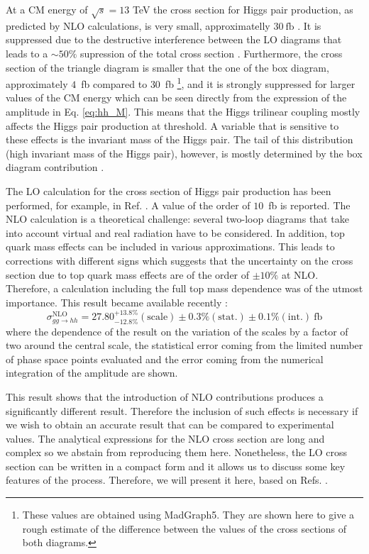 At a CM energy of $\sqrt{s}=13$ TeV the cross section for Higgs pair production, as predicted by NLO calculations, is very small, approximatelly $30~\text{fb}$ \cite{hhxsNLO}. It is suppressed due to the destructive interference between the LO diagrams that leads to a $\sim 50\%$ supression of the total cross section \cite{FCCyellow}. Furthermore, the cross section of the triangle diagram is smaller that the one of the box diagram, approximately $4$~fb compared to $30$~fb \footnote{These values are obtained using MadGraph5. They are shown here to give a rough estimate of the difference between the values of the cross sections  of both diagrams.}, and it is strongly suppressed for larger values of the CM energy which can be seen directly from the expression of the amplitude in Eq. \ref{eq:hh_M}. This means that the Higgs trilinear coupling mostly affects the Higgs pair production at threshold. A variable that is sensitive to these effects is the invariant mass of the Higgs pair. The tail of this distribution (high invariant mass of the Higgs pair), however, is mostly determined by the box diagram contribution \cite{FCCyellow}.  

The LO calculation for the cross section of Higgs pair production has been performed, for example, in Ref. \cite{HHxs_LO}. A value of the order of $10$~fb is reported. The NLO calculation is a theoretical challenge: several two-loop diagrams that take into account virtual and real radiation have to be considered. In addition, top quark mass effects can be included in various approximations. This leads to corrections with different signs which suggests that the uncertainty on the cross section due to top quark mass effects are of the order of $\pm 10\%$ at NLO. Therefore, a calculation including the full top mass dependence was of the utmost importance. This result became available recently \cite{HHcalc_top}:
\begin{equation}
\sigma^{\text{NLO}}_{gg\rightarrow hh} = 27.80^{+13.8\%}_{-12.8\%}(\text{scale})\pm 0.3\%(\text{stat.})\pm 0.1\% (\text{int.})~\text{fb}
\end{equation}
where the dependence of the result on the variation of the scales by a factor of two around the central scale, the statistical error coming from the limited number of phase space points evaluated and the error coming from the numerical integration of the amplitude are shown. 

This result shows that the introduction of NLO contributions produces a significantly different result. Therefore the inclusion of such effects is necessary if we wish to obtain an accurate result that can be compared to experimental values. The analytical expressions for the NLO cross section are long and complex so we abstain from reproducing them here. Nonetheless, the LO cross section can be written in a compact form and it allows us to discuss some key features of the process. Therefore, we will present it here, based on Refs. \cite{HHxs_LO,HHxs_LO1}.

